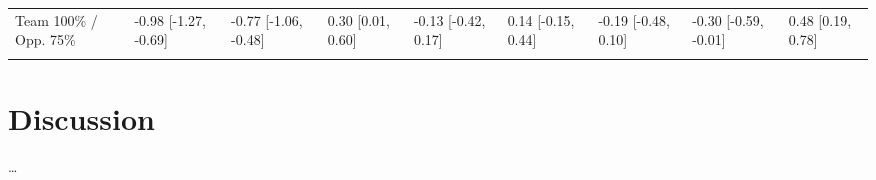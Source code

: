 \documentclass[]{elsarticle} %
\begin{document}
\begin{landscape}
\begin{table}
{\begin{tabular}[t]{lllllllll}
Team 100\% / Opp. 75\% & -0.98 [-1.27, -0.69] & -0.77 [-1.06, -0.48] & 0.30 [0.01, 0.60] & -0.13 [-0.42, 0.17] & 0.14 [-0.15, 0.44] & -0.19 [-0.48, 0.10] & -0.30 [-0.59, -0.01] & 0.48 [0.19, 0.78]\\
\cellcolor{gray!6}{Team 100\% / Opp. 100\%} & \cellcolor{gray!6}{-1.11 [-1.41, -0.81]} & \cellcolor{gray!6}{-0.62 [-0.92, -0.32]} & \cellcolor{gray!6}{0.69 [0.38, 1.00]} & \cellcolor{gray!6}{0.12 [-0.19, 0.43]} & \cellcolor{gray!6}{0.41 [0.10, 0.72]} & \cellcolor{gray!6}{0.00 [-0.30, 0.31]} & \cellcolor{gray!6}{-0.25 [-0.55, 0.06]} & \cellcolor{gray!6}{0.75 [0.44, 1.07]}\\
\bottomrule
\end{tabular}}
\end{table}
\end{landscape}

\hypertarget{discussion}{%
\section{Discussion}\label{discussion}}

\ldots{}
\end{document}
